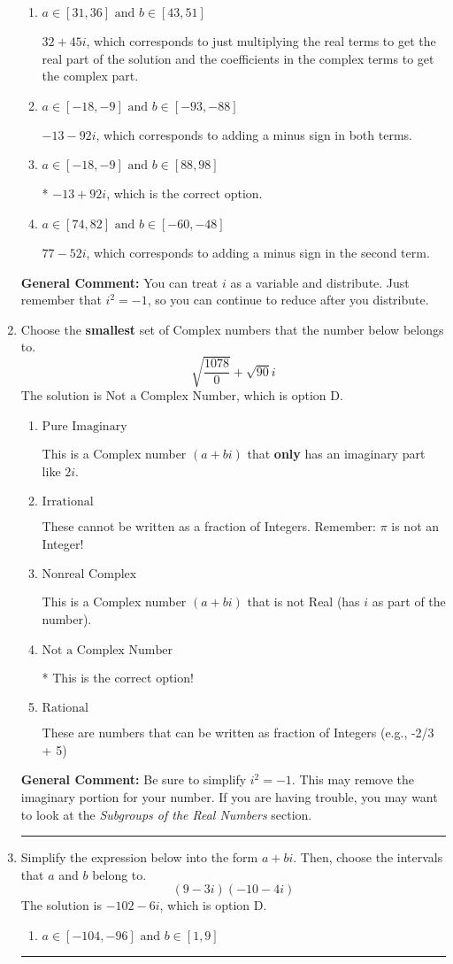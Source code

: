 \documentclass{extbook}[14pt]
\newcommand{\litem}[1]{\item #1

\rule{\textwidth}{0.4pt}}
\begin{document}
\begin{enumerate}
{\begin{enumerate}[label=\Alph*.]
 $77 + 52 i$, which corresponds to adding a minus sign in the first term.
\item \( a \in [31, 36] \text{ and } b \in [43, 51] \)

 $32 + 45 i$, which corresponds to just multiplying the real terms to get the real part of the solution and the coefficients in the complex terms to get the complex part.
\item \( a \in [-18, -9] \text{ and } b \in [-93, -88] \)

 $-13 - 92 i$, which corresponds to adding a minus sign in both terms.
\item \( a \in [-18, -9] \text{ and } b \in [88, 98] \)

* $-13 + 92 i$, which is the correct option.
\item \( a \in [74, 82] \text{ and } b \in [-60, -48] \)

 $77 - 52 i$, which corresponds to adding a minus sign in the second term.
\end{enumerate}

\textbf{General Comment:} You can treat $i$ as a variable and distribute. Just remember that $i^2=-1$, so you can continue to reduce after you distribute.
}
\litem{
Choose the \textbf{smallest} set of Complex numbers that the number below belongs to.
\[ \sqrt{\frac{1078}{0}}+\sqrt{90} i \]The solution is \( \text{Not a Complex Number} \), which is option D.\begin{enumerate}[label=\Alph*.]
\item \( \text{Pure Imaginary} \)

This is a Complex number $(a+bi)$ that \textbf{only} has an imaginary part like $2i$.
\item \( \text{Irrational} \)

These cannot be written as a fraction of Integers. Remember: $\pi$ is not an Integer!
\item \( \text{Nonreal Complex} \)

This is a Complex number $(a+bi)$ that is not Real (has $i$ as part of the number).
\item \( \text{Not a Complex Number} \)

* This is the correct option!
\item \( \text{Rational} \)

These are numbers that can be written as fraction of Integers (e.g., -2/3 + 5)
\end{enumerate}

\textbf{General Comment:} Be sure to simplify $i^2 = -1$. This may remove the imaginary portion for your number. If you are having trouble, you may want to look at the \textit{Subgroups of the Real Numbers} section.
}
\litem{
Simplify the expression below into the form $a+bi$. Then, choose the intervals that $a$ and $b$ belong to.
\[ (9 - 3 i)(-10 - 4 i) \]The solution is \( -102 - 6 i \), which is option D.\begin{enumerate}[label=\Alph*.]
\item \( a \in [-104, -96] \text{ and } b \in [1, 9] \)


\end{enumerate}}
\end{enumerate}
\end{document}
